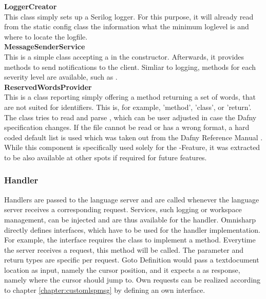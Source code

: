 \textbf{LoggerCreator}\\
This class simply sets up a Serilog \cite{serilog} logger. For this purpose, it will already read from the static config class  the information what the minimum loglevel is and where to locate the logfile.\\

\textbf{MessageSenderService}\\
This is a simple class accepting a  in the constructor. Afterwards, it provides methods to send notifications to the client. Simliar to logging, methods for each severity level are available, such as .\\

\textbf{ReservedWordsProvider}\\
This is a class reporting simply offering a method returning a set of words, that are not suited for identifiers. This is, for example, 'method', 'class', or 'return'. The class tries to read and parse , which can be user adjusted in case the Dafny specification changes. If the file cannot be read or has a wrong format, a hard coded default list is used which was taken out from the Dafny Reference Manual \cite{dafnyReferenceManual}.\\

While this component is specifically used solely for the -Feature, it was extracted to be also available at other spots if required for future features.\\

\subsubsection{Handler}
Handlers are passed to the language server and are called whenever the language server receives a corresponding request. Services, such logging or workspace management, can be injected and are thus available for the handler. Omnisharp directly defines interfaces, which have to be used for the handler implementation. For example, the interface  requires the class to implement a  method. Everytime the server receives a  request, this  method will be called. The parameter and return types are specific per request. Goto Definition would pass a textdocument location as input, namely the cursor position, and it expects a  as response, namely where the cursor should jump to. Own requests can be realized according to chapter \ref{chapter:customlspmsg} by defining an own interface. \\

